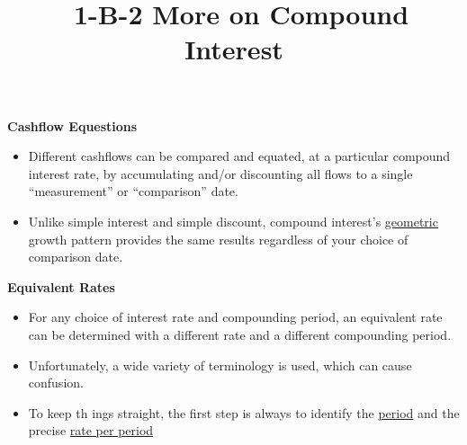 \documentclass[12pt]{article}
\title{\normalfont\ 1-B-2 More on Compound Interest} %
\author{} %
\date{}  %
\begin{document}
\maketitle %

\vspace{-1in}

\begin{flushleft}
    \textbf{Cashflow Equestions}
\end{flushleft}
\vspace{.1in}

\begin{itemize}
    \item Different cashflows can be compared and equated, at a particular compound interest rate, by
          accumulating and/or discounting all flows to a single ``measurement'' or ``comparison'' date.
    \item Unlike simple interest and simple discount, compound interest's \underline{geometric} growth
          pattern provides the same results regardless of your choice of comparison date.
\end{itemize}
\vspace{1.5in}

\begin{flushleft}
    \textbf{Equivalent Rates}
\end{flushleft}
\vspace{.1in}


\begin{itemize}
    \item For any choice of interest rate and compounding period, an equivalent rate can be determined
          with a different rate and a different compounding period.
    \item Unfortunately, a wide variety of terminology is used, which can cause confusion.
    \item To keep th ings straight, the first step is always to identify the \underline{period} and
          the precise \underline{rate per period}
\end{itemize}
\vspace{.1in}


\end{document}
